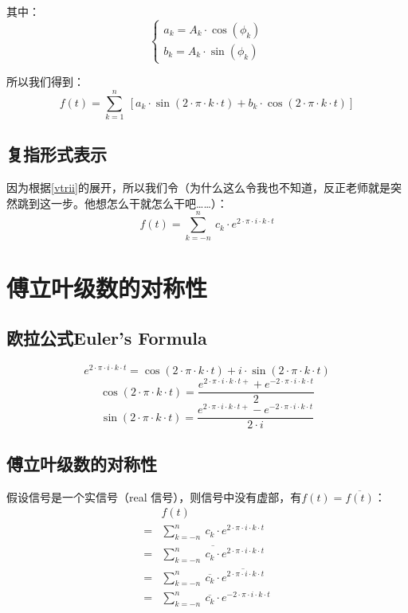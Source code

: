 其中：
$$
	\left\{
	\begin{array}{lr}
		a_k=A_k\cdot \cos(\phi_k) \\
		b_k=A_k\cdot \sin(\phi_k)
	\end{array}
	\right.
$$

所以我们得到：
\begin{equation}\label{vtrii}
	f(t) =\sum\limits_{k=1}^n\ [a_k\cdot \sin(2\cdot\pi\cdot k\cdot t) +b_k\cdot \cos(2\cdot \pi\cdot k\cdot t)]
\end{equation}
\subsection{复指形式表示}
因为根据\ref{vtrii}的展开，所以我们令（为什么这么令我也不知道，反正老师就是突然跳到这一步。他想怎么干就怎么干吧……）：
\begin{equation}
	f(t)=\sum\limits_{k=-n}^n\ c_k\cdot e^{2\cdot \pi \cdot i \cdot k \cdot t}
\end{equation}

\section{傅立叶级数的对称性}
\subsection{欧拉公式Euler's Formula}
\begin{equation}
	e^{2\cdot \pi\cdot i\cdot k\cdot t} =  \cos(2\cdot \pi\cdot k\cdot t)+i\cdot \sin(2\cdot \pi\cdot k\cdot t)
\end{equation}
\begin{equation}
	\cos(2\cdot \pi\cdot k\cdot t)=\frac{e^{2\cdot \pi\cdot i\cdot k\cdot t+}+e^{-2\cdot \pi\cdot i\cdot k\cdot t}}{2}
\end{equation}
\begin{equation}
	\sin(2\cdot \pi\cdot k\cdot t)=\frac{e^{2\cdot \pi\cdot i\cdot k\cdot t+}-e^{-2\cdot \pi\cdot i\cdot k\cdot t}}{2\cdot i}
\end{equation}
\subsection{傅立叶级数的对称性}
假设​信号是一个实信号（real 信号），则信号中没有虚部，有​$f(t)=\overline {f(t)}$：
\begin{align*}
	  & f(t)                                                                                        \\
	= & \sum\limits_{k=-n}^n\ c_k\cdot e^{2\cdot \pi \cdot i \cdot k \cdot t}                       \\
	= & \overline{\sum\limits_{k=-n}^n\ c_k\cdot e^{2\cdot \pi \cdot i \cdot k \cdot t}}            \\
	= & \sum\limits_{k=-n}^n\ \overline{c_k}\cdot \overline{e^{2\cdot \pi \cdot i \cdot k \cdot t}} \\
	= & \sum\limits_{k=-n}^n\ \overline{c_k}\cdot e^{-2\cdot \pi \cdot i \cdot k \cdot t}
\end{align*}

